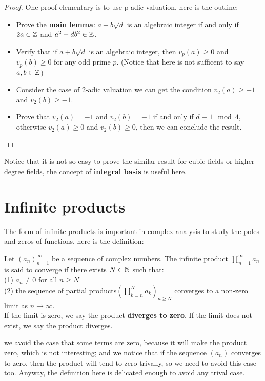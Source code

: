 \documentclass[12pt,a4paper]{article}
\begin{document}
\begin{proof}
    One proof elementary is to use p-adic valuation, here is the outline:
    \begin{itemize}
        \item Prove the \textbf{main lemma}: \(a+b\sqrt{d}\) is an algebraic integer if and only if \(2a \in \mathbb{Z}\) and \(a^2 - db^2 \in \mathbb{Z}\).
        \item Verify that if \(a+b\sqrt{d}\) is an algebraic integer, then \(v_p(a)\geq 0\) and \(v_p(b) \geq 0\) for any odd prime \(p\). (Notice that here is not sufficent to say \(a,b \in \mathbb{Z}\))
        \item Consider the case of 2-adic valuation we can get the condition \(v_2(a) \geq -1\) and \(v_2(b) \geq -1\).
        \item Prove that \(v_2(a) = -1 \) and \(v_2(b) = -1\) if and only if \(d \equiv 1 \mod 4\), otherwise \(v_2(a) \geq 0\) and \(v_2(b) \geq 0\), then we can conclude the result.
    \end{itemize}
\end{proof}
Notice that it is not so easy to prove the similar result for cubic fields or higher degree fields, the concept of \textbf{integral basis} is useful here.

\newpage
\section{Infinite products}
The form of infinite products is important in complex analysis to study the poles and zeros of functions, here is the definition:

\begin{definition}
    Let \((a_n)_{n=1}^{\infty}\) be a sequence of complex numbers. The infinite product \(\prod_{n=1}^{\infty} a_n\) is said to converge if there exists \(N \in \mathbb{N}\) such that:\\
    (1) \(a_n \neq 0\) for all \(n \geq N\)\\
    (2) the sequence of partial products\((\prod_{k=n}^N a_k)_{n \geq N}\) converges to a non-zero limit as \(n \to \infty\).\\
If the limit is zero, we say the product \textbf{diverges to zero}. If the limit does not exist, we say the product diverges.
\end{definition}
we avoid the case that some terms are zero, because it will make the product zero, which is not interesting; and we notice that if the sequence \((a_n)\) converges to zero, then the product will tend to zero trivally, so we need to avoid this case too. Anyway, the definition here is delicated enough to avoid any trival case.
\end{document}
